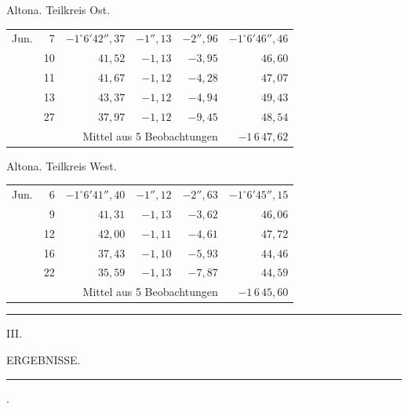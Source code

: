 \noindent\begin{minipage}[t]{.495\textwidth}\centering Altona. Teilkreis Ost.\par\smallskip
{\scriptsize\setlength{\tabcolsep}{1pt}\renewcommand{\arraystretch}{1.2}\begin{tabular}{lr|r|r|r|r|}
Jun.&7&$-1^\circ6'42''{,}37$&$-1''{,}13$&$-2''{,}96$&$-1^\circ6'46''{,}46$\\
&10&$41{,}52$&$-1{,}13$&$-3{,}95$&$46{,}60$\\
&11&$41{,}67$&$-1{,}12$&$-4{,}28$&$47{,}07$\\
&13&$43{,}37$&$-1{,}12$&$-4{,}94$&$49{,}43$\\
&27&$37{,}97$&$-1{,}12$&$-9{,}45$&$48{,}54$\\
\cline{6-6}\multicolumn{5}{r}{Mittel aus 5 Beobachtungen}&$-1\,6\,47{,}62$
\end{tabular}}\end{minipage}\hfill\begin{minipage}[t]{.495\textwidth}\centering Altona. Teilkreis West.\par\smallskip
{\scriptsize\setlength{\tabcolsep}{1pt}\renewcommand{\arraystretch}{1.2}\begin{tabular}{lr|r|r|r|r}
Jun.&6&$-1^\circ6'41''{,}40$&$-1''{,}12$&$-2''{,}63$&$-1^\circ6'45''{,}15$\\
&9&$41{,}31$&$-1{,}13$&$-3{,}62$&$46{,}06$\\
&12&$42{,}00$&$-1{,}11$&$-4{,}61$&$47{,}72$\\
&16&$37{,}43$&$-1{,}10$&$-5{,}93$&$44{,}46$\\
&22&$35{,}59$&$-1{,}13$&$-7{,}87$&$44{,}59$\\
\cline{6-6}\multicolumn{5}{r}{Mittel aus 5 Beobachtungen}&$-1\,6\,45{,}60$
\end{tabular}}\end{minipage}
\par\vspace{4mm}
\begin{center}\rule{.23\textwidth}{.4pt}\end{center}

\clearpage
\vspace*{18mm}
\begin{center}
{\large III.}\par\medskip
{\Large ERGEBNISSE.}\par\medskip
\rule{.09\textwidth}{.4pt}\par{}.
\end{center}

